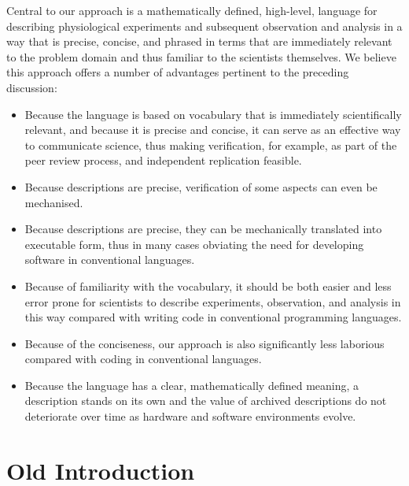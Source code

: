 Central to our approach is a mathematically defined, high-level, language for
describing physiological experiments and subsequent observation and analysis
in a way that is precise, concise, and phrased in terms that are immediately
relevant to the problem domain and thus familiar to the scientists themselves.
We believe this approach offers a number of advantages pertinent to the
preceding discussion:
\begin{itemize}
\item
    Because the language is based on vocabulary that is immediately
    scientifically relevant, and because it is precise and concise, it can
    serve as an effective way to communicate science, thus making verification,
    for example, as part of the peer review process, and independent
    replication feasible.
\item
    Because descriptions are precise, verification of some aspects
    can even be mechanised.
\item
    Because descriptions are precise, they can be mechanically translated
    into executable form, thus in many cases obviating the need for
    developing software in conventional languages.
\item
    Because of familiarity with the vocabulary, it should be both
    easier and less error prone for scientists to describe experiments,
    observation, and analysis in this way compared with writing code in
    conventional programming languages.    
\item
    Because of the conciseness, our approach is also significantly
    less laborious compared with coding in conventional languages.
\item
    Because the language has a clear, mathematically defined meaning,
    a description stands on its own and the value of archived descriptions
    do not deteriorate over time as hardware and software environments
    evolve.
\end{itemize}

\section*{Old Introduction}

